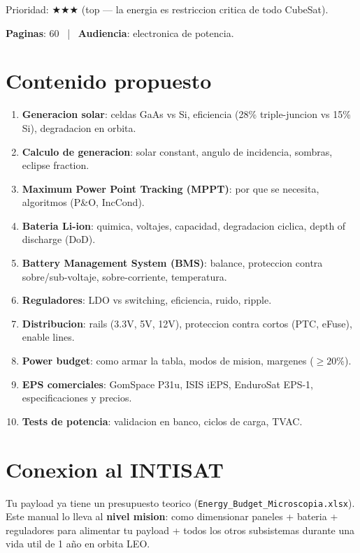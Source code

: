 \documentclass[11pt,a4paper,oneside]{report}
\begin{document}
\begin{prioritario}
Prioridad: $\bigstar\bigstar\bigstar$ (top --- la energia es restriccion
critica de todo CubeSat).
\end{prioritario}

\textbf{Paginas}: 60 ~|~ \textbf{Audiencia}: electronica de potencia.

\section{Contenido propuesto}

\begin{enumerate}[leftmargin=2em]
  \item \textbf{Generacion solar}: celdas GaAs vs Si, eficiencia (28\%
        triple-juncion vs 15\% Si), degradacion en orbita.
  \item \textbf{Calculo de generacion}: solar constant, angulo de incidencia,
        sombras, eclipse fraction.
  \item \textbf{Maximum Power Point Tracking (MPPT)}: por que se necesita,
        algoritmos (P\&O, IncCond).
  \item \textbf{Bateria Li-ion}: quimica, voltajes, capacidad, degradacion
        ciclica, depth of discharge (DoD).
  \item \textbf{Battery Management System (BMS)}: balance, proteccion contra
        sobre/sub-voltaje, sobre-corriente, temperatura.
  \item \textbf{Reguladores}: LDO vs switching, eficiencia, ruido,
        ripple.
  \item \textbf{Distribucion}: rails (3.3V, 5V, 12V), proteccion contra
        cortos (PTC, eFuse), enable lines.
  \item \textbf{Power budget}: como armar la tabla, modos de mision,
        margenes ($\geq 20\%$).
  \item \textbf{EPS comerciales}: GomSpace P31u, ISIS iEPS, EnduroSat
        EPS-1, especificaciones y precios.
  \item \textbf{Tests de potencia}: validacion en banco, ciclos de carga,
        TVAC.
\end{enumerate}

\section{Conexion al INTISAT}

Tu payload ya tiene un presupuesto teorico (\texttt{Energy\_Budget\_Microscopia.xlsx}).
Este manual lo lleva al \textbf{nivel mision}: como dimensionar paneles +
bateria + reguladores para alimentar tu payload + todos los otros
subsistemas durante una vida util de 1 año en orbita LEO.
\end{document}
